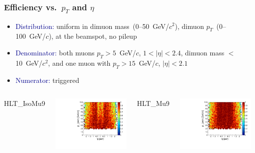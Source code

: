 \documentclass[compress]{beamer}
\begin{document}
\begin{frame}
\frametitle{Efficiency vs.\ $p_T$ and $\eta$}
\begin{itemize}
\item \textcolor{darkblue}{Distribution:} uniform in dimuon mass~(0--50~GeV/$c^2$), dimuon $p_T$~(0--100~GeV/$c$), at the beamspot, no pileup

\item \textcolor{darkblue}{Denominator:} both muons $p_T > 5$~GeV/$c$, $1 < |\eta| < 2.4$, dimuon mass $<$ 10~GeV/$c^2$, and one muon with $p_T > 15$~GeV/$c$, $|\eta| < 2.1$

\item \textcolor{darkblue}{Numerator:} triggered
\end{itemize}

\vfill
\begin{columns}
\centering HLT\_IsoMu9

\includegraphics[width=\linewidth]{pteta_mass10cut_pluscut_IsoMu9.pdf}

\centering HLT\_Mu9

\includegraphics[width=\linewidth]{pteta_mass10cut_pluscut_Mu9.pdf}


\end{columns}
\end{frame}
\end{document}
